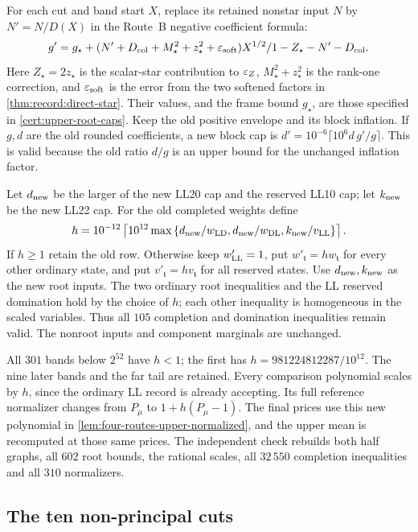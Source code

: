 For each cut and band start $X$, replace its retained nonstar input
$N$ by $N'=N/D(X)$ in the Route~B negative coefficient formula:
\[
 g'=\frac{g_\star+
       (N'+D_{\rm col}+M_\star^2+z_\star^2+\eps_{\rm soft})X^{1/2}}
       {1-Z_\star-N'-D_{\rm col}}.
\]
Here $Z_\star=2z_\star$ is the scalar-star contribution to $\eps_Z$,
$M_\star^2+z_\star^2$ is the rank-one correction, and
$\eps_{\rm soft}$ is the error from the two softened factors in
\cref{thm:record:direct-star}. Their values, and the frame bound
$g_\star$, are those specified in \cref{cert:upper-root-caps}.
Keep the old positive envelope and its
block inflation. If $g,d$ are the old rounded coefficients, a new
block cap is
$d'=10^{-6}\lceil10^6d\,g'/g\rceil$.
This is valid because the old ratio $d/g$ is an upper bound for
the unchanged inflation factor.

Let $d_{\rm new}$ be the larger of the new LL20 cap and the
reserved LL10 cap; let $k_{\rm new}$ be the new LL22 cap. For the
old completed weights define
\[
 h=10^{-12}\left\lceil10^{12}
       \max\left\{\frac{d_{\rm new}}{w_{\rm LD}},
                   \frac{d_{\rm new}}{w_{\rm DL}},
                   \frac{k_{\rm new}}{v_{\rm LL}}\right\}\right\rceil.
\]
If $h\ge1$ retain the old row. Otherwise keep $w'_{\rm LL}=1$,
put $w'_{\mathfrak t}=h w_{\mathfrak t}$ for every other ordinary
state, and put $v'_{\mathfrak t}=h v_{\mathfrak t}$ for all reserved
states. Use $d_{\rm new},k_{\rm new}$ as the new root inputs.
The two ordinary root inequalities and the LL reserved domination
hold by the choice of $h$; each other inequality is homogeneous in
the scaled variables. Thus all $105$ completion and domination
inequalities remain valid. The nonroot inputs and component
marginals are unchanged.

All $301$ bands below $2^{52}$ have $h<1$; the first has
$h=981224812287/10^{12}$. The nine later bands and the far tail are
retained. Every comparison polynomial scales by $h$, since the
ordinary LL record is already accepting. Its full reference
normalizer changes from $P_\mu$ to $1+h(P_\mu-1)$.
The final prices use this new polynomial in
\cref{lem:four-routes-upper-normalized}, and the upper mean is
recomputed at those same prices. The independent check
rebuilds both half graphs, all $602$ root bounds, the rational
scales, all $32\,550$ completion inequalities and all $310$
normalizers.

\subsection{The ten non-principal cuts}\label{subsec:upper-nonroot}

